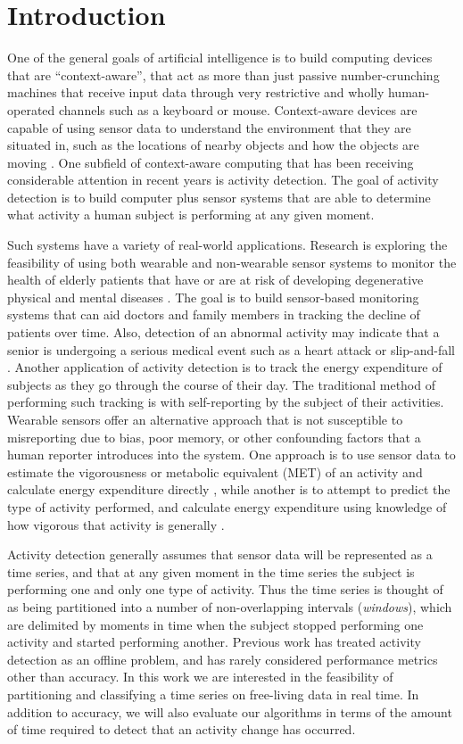 \chapter{Introduction}
One of the general goals of artificial intelligence is to build
computing devices that are ``context-aware'', that act as
more than just passive number-crunching machines that receive input data through very
restrictive and wholly human-operated channels such as a keyboard or mouse.
Context-aware devices are capable of using sensor data to understand the
environment that they are situated in, such as the locations of nearby objects
and how the objects are moving \cite{abowd99}. One subfield of context-aware
computing that has been receiving considerable attention in recent years is activity
detection. The goal of activity detection is to build computer plus sensor systems
that are able to determine what activity a human subject is performing at any given
moment.

Such systems have a variety of real-world applications. Research is 
exploring the feasibility of using both wearable and non-wearable sensor systems to
monitor the health of elderly patients that have or are at risk of developing
degenerative physical and mental diseases \cite{fogarty06}. The goal is to 
build sensor-based monitoring systems that can aid doctors and family
members in tracking the decline of patients over time. Also, detection of an
abnormal activity may indicate that a senior is undergoing a serious medical
event such as a heart attack or slip-and-fall \cite{wang12}.
Another application of activity detection is to track the energy expenditure
of subjects as they go through the course of their day. The
traditional method of performing such tracking is with self-reporting by the
subject of their activities. Wearable sensors offer an alternative approach that
is not susceptible to misreporting due to bias, poor memory, or other
confounding factors that a human reporter introduces into the system. One
approach is to use sensor data to estimate the vigorousness or metabolic equivalent
(MET) of an activity and calculate energy expenditure directly \cite{staudenmeyer09},
while another is to attempt to predict the type of activity performed, and calculate energy
expenditure using knowledge of how vigorous that activity is generally \cite{trost12}.

Activity detection generally assumes that sensor data will be represented as a
time series, and that at any given moment in the time series the subject is
performing one and only one type of activity. Thus the time series is thought
of as being partitioned into a number of non-overlapping intervals (\emph{windows}), which are
delimited by moments in time when the subject stopped performing one activity
and started performing another. Previous work has treated activity detection as an
offline problem, and has rarely considered performance metrics other than accuracy.
In this work we are interested in the feasibility of partitioning and
classifying a time series on free-living data in real time. In addition to
accuracy, we will also evaluate our algorithms in terms of the amount of time
required to detect that an activity change has occurred.

